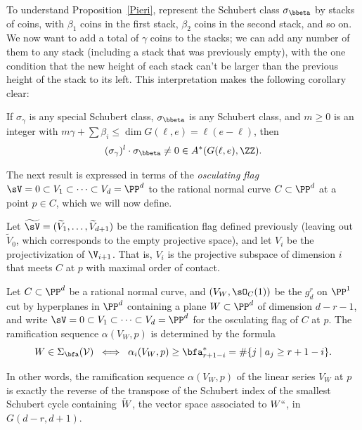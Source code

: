 To understand Proposition~\ref{Pieri}, represent the Schubert class
$\sigma_{\bbeta}$ by
stacks of coins,
%
with $\beta_1$ coins in the first
stack, $\beta_2$ coins in the second stack, and so on. We now want to
add a total of $\gamma$ coins to the stacks; we can add any number of
them to any stack (including a stack that was previously empty), with
the one condition that the new height of each stack can't be larger than
the previous height of the stack to its left. This interpretation makes
the following corollary clear:

\begin{corollary}\label{intersection with sigma nonzero}
If $\sigma_\gamma$ is any special Schubert class, $\sigma_{\bbeta}$
is any Schubert class,
and $m\geq 0$ is an integer with $m \gamma + \sum \beta_i \leq \dim
G(\ell, e) = \ell(e-\ell)$, then
$$
(\sigma_\gamma)^l \cdot \sigma_{\bbeta} \neq 0 \in A^*(G(\ell, e), \ZZ).
$$
\end{corollary}

The next result is expressed in terms of the \emph{osculating flag}
%
$\sV = 0\subset
V_1\subset \cdots \subset V_d = \PP^d$
to the rational normal curve $C\subset \PP^{d}$ at a point $p\in C$, which
we will now define.

\def\tL{\,\widetilde{\!W\!}\,} %
\def\tsV{{\widetilde \sV}}
\def\tV{{\widetilde V}}

Let $\tsV = (\tV_1, \dots, \tV_{d+1})$ be the
 ramification flag defined previously (leaving
out $\tV_{0}$, which corresponds to the empty projective space),
and let $V_{i}$ be the projectivization of $\V_{i+1}$. That is,
$V_{i}$ is the projective subspace of dimension $i$ that meets $C$ at $p$
with maximal order of contact.

\begin{proposition}\label{ramification}
Let $C \subset \PP^d$ be a rational normal curve, and $(V_W, \sO_C(1))$
be the $g^r_d$ on $\PP^1$ cut by hyperplanes in $\PP^d$ containing a
plane $W \subset \PP^d$ of dimension $d-r-1$, and write $\sV = 0\subset
V_1\subset \cdots \subset V_d = \PP^d$ for the
osculating flag
of $C$
at $p$. The ramification sequence $\alpha(V_W, p)$
%
is determined by the formula
%
$$
W \in \Sigma_{\bfa}({\cal V}) \; \iff \; \alpha_i(V_W, p) \geq
\bfa^*_{r+1-i} = \#\{j\mid a_j\geq r+1-i\}.
$$
\end{proposition}

In other words, the ramification sequence $\alpha(V_W, p)$ of the linear
series $V_W$ at $p$ is exactly the reverse of the transpose of the
Schubert index of the smallest Schubert cycle containing $\tL$, the vector
space associated to $W` `$, in  $G(d-r, d+1)$.

